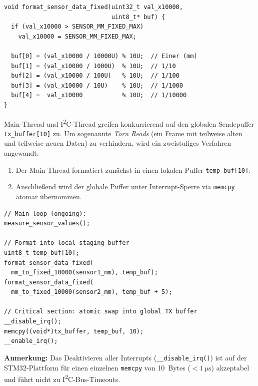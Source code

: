 \begin{lstlisting}[style=firmwarestyle, caption={Ziffernformatierung (\texttt{format\_sensor\_data\_fixed}, Z.~221--229).}, label={lst:sensor_format_fixed}]
void format_sensor_data_fixed(uint32_t val_x10000,
                              uint8_t* buf) {
  if (val_x10000 > SENSOR_MM_FIXED_MAX)
    val_x10000 = SENSOR_MM_FIXED_MAX;

  buf[0] = (val_x10000 / 10000U) % 10U;  // Einer (mm)
  buf[1] = (val_x10000 / 1000U)  % 10U;  // 1/10
  buf[2] = (val_x10000 / 100U)   % 10U;  // 1/100
  buf[3] = (val_x10000 / 10U)    % 10U;  // 1/1000
  buf[4] =  val_x10000           % 10U;  // 1/10000
}
\end{lstlisting}

\label{sec:sensor_atomare_uebernahme}

Main-Thread und I\textsuperscript{2}C-Thread greifen konkurrierend auf den globalen Sendepuffer \texttt{tx\_buffer[10]} zu.
Um sogenannte \emph{Torn Reads} (ein Frame mit teilweise alten und teilweise neuen Daten) zu verhindern, wird ein zweistufiges Verfahren angewandt:

\begin{enumerate}
  \item Der Main-Thread formatiert zunächst in einen lokalen Puffer \texttt{temp\_buf[10]}.
  \item Anschließend wird der globale Puffer unter Interrupt-Sperre via \texttt{memcpy} atomar übernommen.
\end{enumerate}

\begin{lstlisting}[style=firmwarestyle, caption={Atomare Pufferübernahme in der Hauptschleife (\texttt{main.cpp}, Z.~378--388).}, label={lst:sensor_atomic_copy}]
// Main loop (ongoing):
measure_sensor_values();

// Format into local staging buffer
uint8_t temp_buf[10];
format_sensor_data_fixed(
  mm_to_fixed_10000(sensor1_mm), temp_buf);
format_sensor_data_fixed(
  mm_to_fixed_10000(sensor2_mm), temp_buf + 5);

// Critical section: atomic swap into global TX buffer
__disable_irq();
memcpy((void*)tx_buffer, temp_buf, 10);
__enable_irq();
\end{lstlisting}

\textbf{Anmerkung:} Das Deaktivieren aller Interrupts (\texttt{\_\_disable\_irq()}) ist auf der STM32-Plattform für einen einzelnen \texttt{memcpy} von \num{10}~Bytes ($<\qty{1}{\micro\second}$) akzeptabel und führt nicht zu I\textsuperscript{2}C-Bus-Timeouts.

